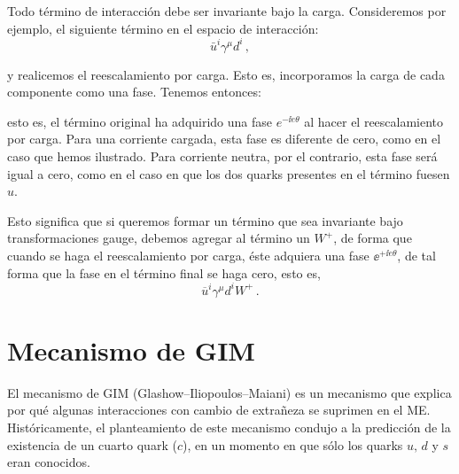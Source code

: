Todo término de interacción debe ser invariante bajo la carga. Consideremos por ejemplo, el siguiente término en el espacio de interacción:
%
\begin{equation}
	\bar{u}^i \gamma^\mu d^i \,,
\end{equation}

\noindent y realicemos el reescalamiento por carga. Esto es, incorporamos la carga de cada componente como una fase. Tenemos entonces:
%

\noindent esto es, el término original ha adquirido una fase $e^{-\ii e \theta}$ al hacer el reescalamiento por carga. Para una corriente cargada, esta fase es diferente de cero, como en el caso que hemos ilustrado. Para corriente neutra, por el contrario, esta fase será igual a cero, como en el caso en que los dos quarks presentes en el término fuesen $u$.

Esto significa que si queremos formar un término que sea invariante bajo transformaciones gauge, debemos agregar al término un $W^+$, de forma que cuando se haga el reescalamiento por carga, éste adquiera una fase $\ee^{+\ii e \theta}$, de tal forma que la fase en el término final se haga cero, esto es,
%
\begin{equation}
	\overline{u}^i \gamma^\mu d^i W^+ \,.
\end{equation}



\section{Mecanismo de GIM}

El mecanismo de GIM (Glashow--Iliopoulos--Maiani) es un mecanismo que explica por qué algunas interacciones con cambio de extrañeza se suprimen en el ME. Históricamente, el planteamiento de este mecanismo condujo a la predicción de la existencia de un cuarto quark ($c$), en un momento en que sólo los quarks $u,\, d$ y $s$ eran conocidos.

